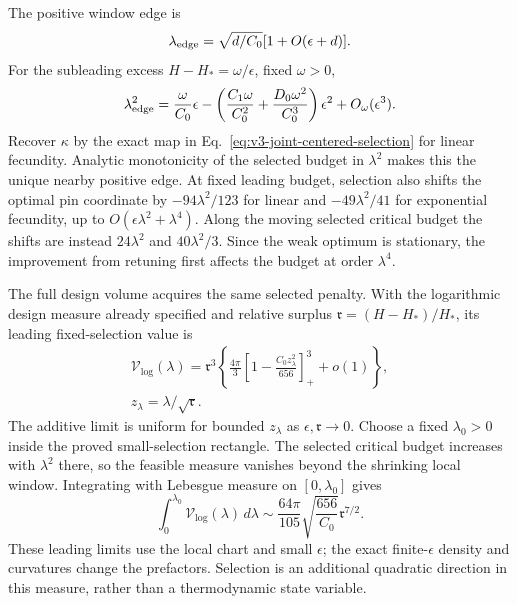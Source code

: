 \documentclass[aps,pre,reprint,amsmath,amssymb,longbibliography]{revtex4-2}
\begin{document}
The positive window edge is
\begin{equation}
 \lambda_{\rm edge}=\sqrt{d/C_0}[1+O(\epsilon+d)].
 \label{eq:v3-joint-window-edge}
\end{equation}
For the subleading excess $H-H_*=\omega/\epsilon$, fixed $\omega>0$,
\begin{equation}
 \lambda_{\rm edge}^2=\frac{\omega}{C_0}\epsilon
 -\left(\frac{C_1\omega}{C_0^2}
       +\frac{D_0\omega^2}{C_0^3}\right)\epsilon^2
 +O_\omega(\epsilon^3).
 \label{eq:v3-joint-window-two-term}
\end{equation}
Recover $\kappa$ by the exact map in
Eq.~\eqref{eq:v3-joint-centered-selection} for linear fecundity.
Analytic monotonicity of the selected budget in $\lambda^2$ makes
this the unique nearby positive edge. At fixed leading budget,
selection also shifts the optimal pin coordinate by
$-94\lambda^2/123$ for linear and $-49\lambda^2/41$ for exponential
fecundity, up to $O(\epsilon\lambda^2+\lambda^4)$.
Along the moving selected critical budget the shifts are instead
$24\lambda^2$ and $40\lambda^2/3$. Since the weak optimum is
stationary, the improvement from retuning first affects the budget
at order $\lambda^4$.

The full design volume acquires the same selected penalty. With the
logarithmic design measure already specified and relative surplus
$\mathfrak r=(H-H_*)/H_*$, its leading fixed-selection value is
\begin{equation}
 \begin{gathered}
 \mathcal V_{\log}(\lambda)=\mathfrak r^3
 \left\{\frac{4\pi}{3}\left[1-\frac{C_0z_\lambda^2}{656}\right]_+^3+o(1)\right\},\\
 z_\lambda=\lambda/\sqrt{\mathfrak r}.
 \end{gathered}
 \label{eq:v3-joint-selected-volume}
\end{equation}
The additive limit is uniform for bounded $z_\lambda$ as
$\epsilon,\mathfrak r\to0$. Choose a fixed $\lambda_0>0$
inside the proved small-selection rectangle. The selected critical
budget increases with $\lambda^2$ there, so the feasible measure
vanishes beyond the shrinking local window. Integrating with
Lebesgue measure on $[0,\lambda_0]$ gives
\begin{equation}
 \int_0^{\lambda_0} \mathcal V_{\log}(\lambda)\,d\lambda
 \sim\frac{64\pi}{105}\sqrt{\frac{656}{C_0}}
                     \mathfrak r^{7/2}.
 \label{eq:v3-joint-selection-volume}
\end{equation}
These leading limits use the local chart and small $\epsilon$;
the exact finite-$\epsilon$ density and curvatures change the
prefactors. Selection is an additional quadratic direction in this
measure, rather than a thermodynamic state variable.
\end{document}
